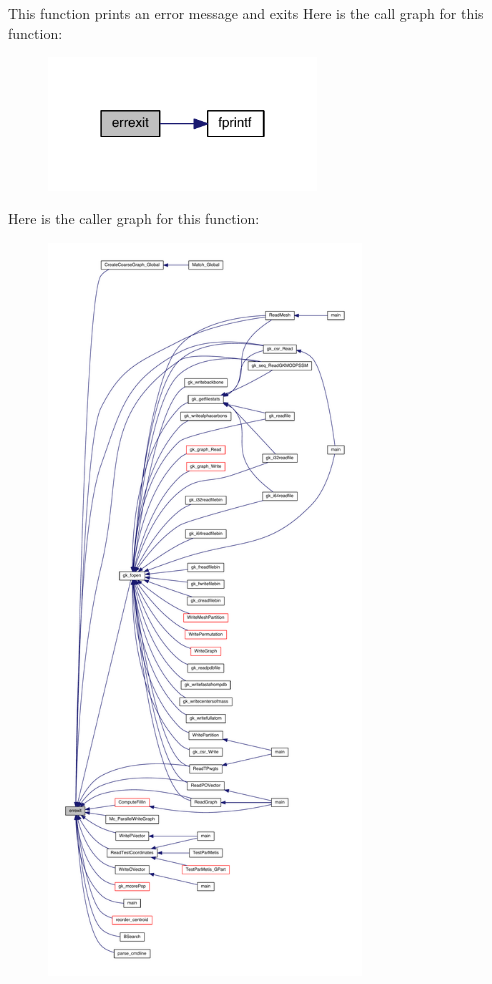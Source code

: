 This function prints an error message and exits Here is the call graph for this function\+:\nopagebreak
\begin{figure}[H]
\begin{center}
\leavevmode
\includegraphics[width=202pt]{a00026_a56d0f2cc40cd8633a784582d6200d8b5_cgraph}
\end{center}
\end{figure}
Here is the caller graph for this function\+:\nopagebreak
\begin{figure}[H]
\begin{center}
\leavevmode
\includegraphics[height=550pt]{a00026_a56d0f2cc40cd8633a784582d6200d8b5_icgraph}
\end{center}
\end{figure}
\mbox{\label{a00026_a4c320c13bcdc9967613253ef4c73f59f}} 
